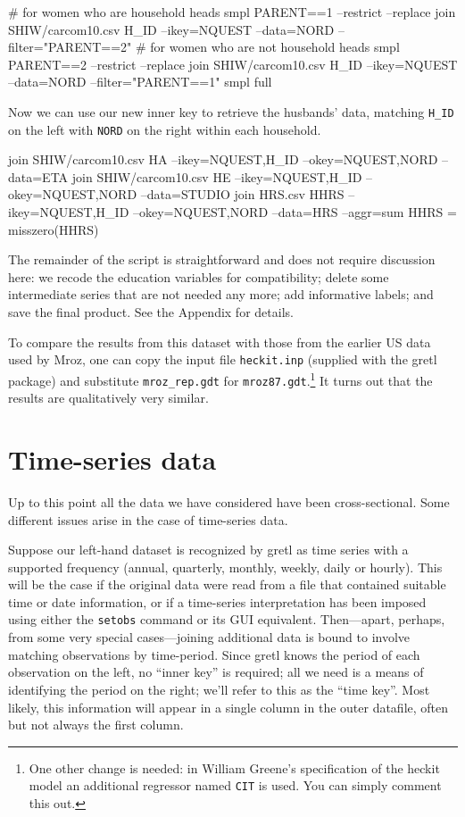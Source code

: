 %
\begin{code}
# for women who are household heads
smpl PARENT==1 --restrict --replace
join SHIW/carcom10.csv H_ID --ikey=NQUEST --data=NORD --filter="PARENT==2"
# for women who are not household heads
smpl PARENT==2 --restrict --replace
join SHIW/carcom10.csv H_ID --ikey=NQUEST --data=NORD --filter="PARENT==1"
smpl full
\end{code}
%
Now we can use our new inner key to retrieve the husbands' data,
matching \verb|H_ID| on the left with \texttt{NORD} on the right
within each household.
%
\begin{code}
join SHIW/carcom10.csv HA --ikey=NQUEST,H_ID --okey=NQUEST,NORD --data=ETA
join SHIW/carcom10.csv HE --ikey=NQUEST,H_ID --okey=NQUEST,NORD --data=STUDIO
join HRS.csv HHRS --ikey=NQUEST,H_ID --okey=NQUEST,NORD --data=HRS --aggr=sum
HHRS = misszero(HHRS)
\end{code}
%
The remainder of the script is straightforward and does not require
discussion here: we recode the education variables for compatibility;
delete some intermediate series that are not needed any more; add
informative labels; and save the final product. See the Appendix for
details.

To compare the results from this dataset with those from the earlier
US data used by Mroz, one can copy the input file \texttt{heckit.inp}
(supplied with the gretl package) and substitute \verb|mroz_rep.gdt|
for \texttt{mroz87.gdt}.\footnote{One other change is needed: in
  William Greene's specification of the heckit model an additional
  regressor named \texttt{CIT} is used. You can simply comment this
  out.} It turns out that the results are qualitatively very similar.


\section{Time-series data}
\label{sec:join-timeser}

Up to this point all the data we have considered have been
cross-sectional. Some different issues arise in the case of
time-series data.

Suppose our left-hand dataset is recognized by gretl as time series
with a supported frequency (annual, quarterly, monthly, weekly, daily
or hourly). This will be the case if the original data were read from
a file that contained suitable time or date information, or if a
time-series interpretation has been imposed using either the
\texttt{setobs} command or its GUI equivalent.  Then---apart, perhaps,
from some very special cases---joining additional data is bound to
involve matching observations by time-period. Since gretl knows the
period of each observation on the left, no ``inner key'' is required;
all we need is a means of identifying the period on the right; we'll
refer to this as the ``time key''. Most likely, this information will
appear in a single column in the outer datafile, often but not always
the first column.

